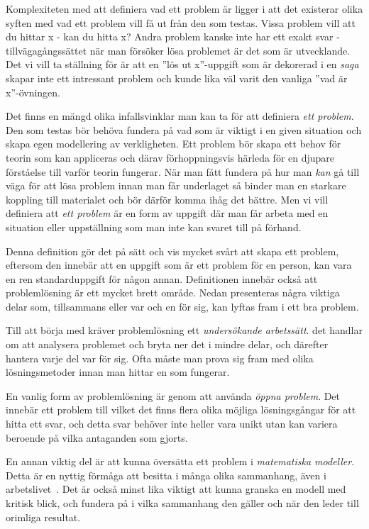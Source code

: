 
\textcolor{WildStrawberry}{
    Komplexiteten med att definiera vad ett problem är ligger i att det existerar olika syften med vad ett problem vill få ut från den som testas. Vissa problem vill att du hittar x - kan du hitta x? Andra problem kanske inte har ett exakt svar - tillvägagångssättet när man försöker lösa problemet är det som är utvecklande. Det vi vill ta ställning för är att en ''lös ut x''-uppgift som är dekorerad i en \textit{saga} skapar inte ett intressant problem och kunde lika väl varit den vanliga ''vad är x''-övningen. 
}

\textcolor{WildStrawberry}{
    Det finns en mängd olika infallsvinklar man kan ta för att definiera \textit{ett problem}. Den som testas bör behöva fundera på vad som är viktigt i en given situation och skapa egen modellering av verkligheten. Ett problem bör skapa ett behov för teorin som kan appliceras och därav förhoppningsvis härleda för en djupare förståelse till varför teorin fungerar. När man fått fundera på hur man \textit{kan} gå till väga för att lösa problem innan man får underlaget så binder man en starkare koppling till materialet och bör därför komma ihåg det bättre. Men vi vill definiera att \textit{ett problem} är en form av uppgift där man får arbeta med en situation eller uppställning som man inte kan svaret till på förhand.
}


    \textcolor{lila}{Denna definition gör det på sätt och vis mycket svårt att skapa ett problem, eftersom den innebär att en uppgift som är ett problem för en person, kan vara en ren standarduppgift för någon annan. Definitionen innebär också att problemlösning är ett mycket brett område. Nedan presenteras några viktiga delar som, tillsammans eller var och en för sig, kan lyftas fram i ett bra problem.}
    
    \textcolor{lila}{Till att börja med kräver problemlösning ett \textsl{undersökande arbetssätt}. det handlar om att analysera problemet och bryta ner det i mindre delar, och därefter hantera varje del var för sig. Ofta måste man prova sig fram med olika lösningsmetoder innan man hittar en som fungerar.}
        
    \textcolor{lila}{En vanlig form av problemlösning är genom att använda \textsl{öppna problem}. Det innebär ett  problem till vilket det finns flera olika möjliga lösningsgångar för att hitta ett svar, och detta svar behöver inte heller vara unikt utan kan variera beroende på vilka antaganden som gjorts.}

    \textcolor{lila}{En annan viktig del är att kunna översätta ett problem i \textsl{matematiska modeller}. Detta är en nyttig förmåga att besitta i många olika sammanhang, även i arbetslivet~\cite{TheElephant}. Det är också minst lika viktigt att kunna granska en modell med kritisk blick, och fundera på i vilka sammanhang den gäller och när den leder till orimliga resultat.}